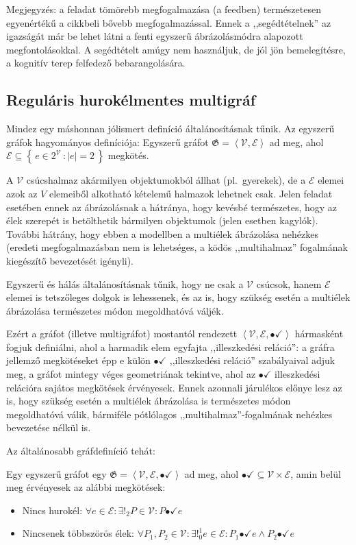 \documentclass{article}
\newcommand{\incidsymbol}{\bullet\!\!\!\checkmark}
\newcommand{\incid}{\mathrel{\incidsymbol}} %
\begin{document}
	Megjegyzés: a feladat tömörebb megfogalmazása (a feedben) természetesen egyenértékű a cikkbeli bővebb megfogalmazással.
	Ennek a ,,segédtételnek'' az igazságát már be lehet látni a fenti egyszerű ábrázolásmódra alapozott megfontolásokkal.
	A segédtételt amúgy nem használjuk, de jól jön bemelegítésre, a kognitív terep felfedező bebarangolására.

	\subsection{Reguláris hurokélmentes multigráf}

	Mindez egy máshonnan jólismert definíció általánosításnak tűnik.
	Az egyszerű gráfok hagyományos definíciója:
	Egyszerű gráfot $\mathfrak G = \left\langle \mathcal V, \mathcal E \right\rangle$ ad meg, ahol $\mathcal E \subseteq \left\{\,e \in 2^{\mathcal V}\, : \left|e\right| = 2\,\right\}$ megkötés.

	A $\mathcal V$ csúcshalmaz akármilyen objektumokból állhat (pl.~gyerekek), de a $\mathcal E$ elemei azok az $V$ elemeiből alkotható kételemű halmazok lehetnek csak. Jelen feladat esetében ennek az ábrázolásnak a hátránya, hogy kevésbé természetes, hogy az élek szerepét is betölthetik bármilyen objektumok (jelen esetben kagylók). További hátrány, hogy ebben a modellben a multiélek ábrázolása nehézkes (eredeti megfogalmazásban nem is lehetséges, a ködös ,,multihalmaz'' fogalmának kiegészítő bevezetését igényli).

	Egyszerű és hálás általánosításnak tűnik, hogy ne csak a $\mathcal V$ csúcsok, hanem $\mathcal E$ elemei is tetszőleges dolgok is lehessenek, és az is, hogy szükség esetén a multiélek ábrázolása természetes módon megoldhatóvá váljék.
	
	Ezért a gráfot (illetve multigráfot) mostantól rendezett $\left\langle \mathcal V, \mathcal E, \incidsymbol\right\rangle$ hármasként fogjuk definiálni, ahol a harmadik elem egyfajta ,,illeszkedési reláció'': a gráfra jellemző megkötéseket épp e külön $\incid$ ,,illeszkedési reláció'' szabályaival adjuk meg, a gráfot mintegy véges geometriának tekintve, ahol az $\incid$ illeszkedési relációra sajátos megkötések érvényesek. Ennek azonnali járulékos előnye lesz az is, hogy szükség esetén a multiélek ábrázolása is természetes módon megoldhatóvá válik, bármiféle pótlólagos ,,multihalmaz''-fogalmának nehézkes bevezetése nélkül is.

	Az általánosabb gráfdefiníció tehát:

	Egy egyszerű gráfot egy $\mathfrak G = \left\langle \mathcal V, \mathcal E, \incidsymbol\right\rangle$ ad meg, ahol $\incidsymbol \subseteq \mathcal V \times \mathcal E$, amin belül meg érvényesek az alábbi megkötések:
	\begin{itemize}
		\item
		Nincs hurokél: $\forall e \in \mathcal E: \exists!_2 P \in \mathcal V: P \incid e$ 
		\item
		Nincsenek többszörös élek: $\forall P_1, P_2 \in \mathcal V: \exists!_0^1 e \in \mathcal E: P_1  \incid e \land P_2 \incid e$
	\end{itemize}
\end{document}
